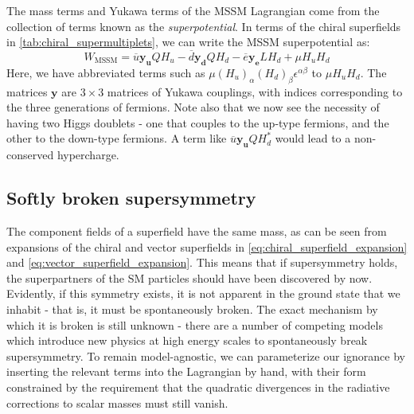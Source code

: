 The mass terms and Yukawa terms of the MSSM Lagrangian come from the collection of terms known as the \emph{superpotential}. 
In terms of the chiral superfields in \autoref{tab:chiral_supermultiplets}, we can write the MSSM superpotential as:
\[W_\text{MSSM} = \overline{u}\mathbf{y_u}QH_u-\overline{d}\mathbf{y_d}Q H_d-\overline{e}\mathbf{y_e}L H_d+\mu H_u H_d \]
Here, we have abbreviated terms such as $\mu(H_u)_\alpha (H_d)_\beta\epsilon^{\alpha\beta}$ to $\mu H_u H_d$. The matrices $\mathbf{y}$ are $3\times3$ matrices of Yukawa couplings, with indices corresponding to the three generations of fermions. Note also that we now see the necessity of having two Higgs doublets - one that couples to the up-type fermions, and the other to the down-type fermions. A term like $\overline{u}\mathbf{y_u}QH_d^*$ would lead to a non-conserved hypercharge.

\subsection{Softly broken supersymmetry}
The component fields of a superfield have the same mass, as can be seen from expansions of the chiral and vector superfields in \eqref{eq:chiral_superfield_expansion} and \eqref{eq:vector_superfield_expansion}. This means that if supersymmetry holds, the superpartners of the SM particles should have been discovered by now. Evidently, if this symmetry exists, it is not apparent in the ground state that we inhabit - that is, it must be spontaneously broken. The exact mechanism by which it is broken is still unknown - there are a number of competing models which introduce new physics at high energy scales to spontaneously break supersymmetry. To remain model-agnostic, we can parameterize our ignorance by inserting the relevant terms into the Lagrangian by hand, with their form constrained by the requirement that the quadratic divergences in the radiative corrections to scalar masses must still vanish.

